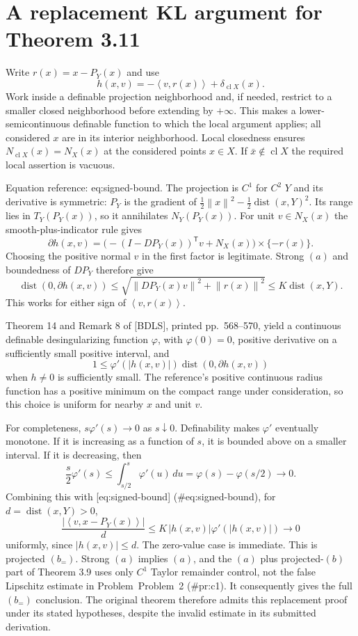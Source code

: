 \documentclass[10pt]{article}
\begin{document}
\section*{A replacement KL argument for Theorem 3.11}
Write \(r(x)=x-P_Y(x)\) and use \[h(x,v)=-\left\langle v,r(x)\right\rangle+\delta_{\mathop{\mathrm{cl}}X}(x).\] Work inside a definable projection neighborhood and, if needed, restrict to a smaller closed neighborhood before extending by \(+\infty\). This makes a lower-semicontinuous definable function to which the local argument applies; all considered \(x\) are in its interior neighborhood. Local closedness ensures \(N_{\mathop{\mathrm{cl}}X}(x)=N_X(x)\) at the considered points \(x\in X\). If \(\bar x\notin\mathop{\mathrm{cl}}X\) the required local assertion is vacuous.\par
Equation reference: eq:signed-bound. The projection is \(C^1\) for \(C^2\) \(Y\) and its derivative is symmetric: \(P_Y\) is the gradient of \(\frac12\left\|x\right\|^2-\frac12\mathop{\mathrm{dist}}(x,Y)^2\). Its range lies in \(T_Y(P_Y(x))\), so it annihilates \(N_Y(P_Y(x))\). For unit \(v\in N_X(x)\) the smooth-plus-indicator rule gives \[\partial h(x,v)
 =\bigl(-(I-DP_Y(x))^{\mathsf T}v+N_X(x)\bigr)\times\{-r(x)\}.\] Choosing the positive normal \(v\) in the first factor is legitimate. Strong \((a)\) and boundedness of \(DP_Y\) therefore give \[
 \mathop{\mathrm{dist}}(0,\partial h(x,v))
 \le \sqrt{\left\|DP_Y(x)v\right\|^2+\left\|r(x)\right\|^2}
 \le K\mathop{\mathrm{dist}}(x,Y).\] This works for either sign of \(\left\langle v,r(x)\right\rangle\).\par
Theorem 14 and Remark 8 of [BDLS], printed pp. 568–570, yield a continuous definable desingularizing function \(\varphi\), with \(\varphi(0)=0\), positive derivative on a sufficiently small positive interval, and \[1\le\varphi'(|h(x,v)|)\mathop{\mathrm{dist}}(0,\partial h(x,v))\] when \(h\ne0\) is sufficiently small. The reference’s positive continuous radius function has a positive minimum on the compact range under consideration, so this choice is uniform for nearby \(x\) and unit \(v\).\par
For completeness, \(s\varphi'(s)\to0\) as \(s\downarrow0\). Definability makes \(\varphi'\) eventually monotone. If it is increasing as a function of \(s\), it is bounded above on a smaller interval. If it is decreasing, then \[\frac{s}{2}\varphi'(s)
 \le\int_{s/2}^{s}\varphi'(u)\,du
 =\varphi(s)-\varphi(s/2)\longrightarrow0 .\] Combining this with [eq:signed-bound] (\#eq:signed-bound), for \(d=\mathop{\mathrm{dist}}(x,Y)>0\), \[\frac{|\left\langle v,x-P_Y(x)\right\rangle|}{d}
 \le K\,|h(x,v)|\varphi'(|h(x,v)|)\longrightarrow0\] uniformly, since \(|h(x,v)|\le d\). The zero-value case is immediate. This is projected \((b_=)\). Strong \((a)\) implies \((a)\), and the \((a)\) plus projected-\((b)\) part of Theorem 3.9 uses only \(C^1\) Taylor remainder control, not the false Lipschitz estimate in Problem Problem 2 (\#pr:c1). It consequently gives the full \((b_=)\) conclusion. The original theorem therefore admits this replacement proof under its stated hypotheses, despite the invalid estimate in its submitted derivation.\par
\end{document}
